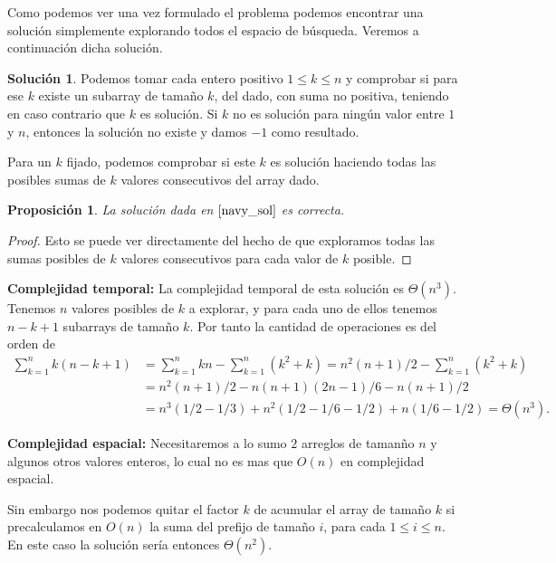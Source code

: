 \documentclass[10pt]{amsart}
\newtheorem{prop}[theorem]{Proposici\'on}
\theoremstyle{definition}
\newtheorem{sol}[theorem]{Soluci\'on}
\numberwithin{equation}{section}
\begin{document}
	Como podemos ver una vez formulado el problema podemos encontrar una soluci\'on simplemente explorando todos el espacio de b\'usqueda. Veremos a continuaci\'on dicha soluci\'on.
	
	\begin{sol}\label{navy_sol}
		Podemos tomar cada entero positivo $1 \le k \le n$ y comprobar si para ese $k$ existe un subarray de tama\~no $k$, del dado, con suma no positiva, teniendo en caso contrario que $k$ es soluci\'on. Si $k$ no es soluci\'on para ning\'un valor entre $1$ y $n$, entonces la soluci\'on no existe y damos $-1$ como resultado.
		
		Para un $k$ fijado, podemos comprobar si este $k$ es soluci\'on haciendo todas las posibles sumas de $k$ valores consecutivos del array dado.
	\end{sol}

	\begin{prop}
		La soluci\'on dada en $\ref{navy_sol}$ es correcta.
	\end{prop}

	\begin{proof}
		Esto se puede ver directamente del hecho de que exploramos todas las sumas posibles de $k$ valores consecutivos para cada valor de $k$ posible.		
	\end{proof}

	\textbf{Complejidad temporal:} La complejidad temporal de esta soluci\'on es $\Theta(n^3)$. Tenemos $n$ valores posibles de $k$ a explorar, y para cada uno de ellos tenemos $n - k + 1$ subarrays de tama\~no $k$. Por tanto la cantidad de operaciones es del orden de 
	\begin{align}
		\sum_{k = 1}^n k(n - k + 1) &= \sum_{k = 1}^n kn - \sum_{k = 1}^n  (k^2 + k) = n^2(n + 1) / 2 - \sum_{k = 1}^n ( k^2 + k) 
		\\ &= n^2(n+1)/2 - n(n+1)(2n-1)/6 - n( n+ 1) / 2 
		\\ &= n^3(1/2 - 1/3) + n^2(1/2 - 1/6 - 1/2) + n(1/6 - 1/2) = \Theta(n^3).  
	\end{align}

	\textbf{Complejidad espacial:} Necesitaremos a lo sumo $2$ arreglos de taman\~no $n$ y algunos otros valores enteros, lo cual no es mas que $O(n)$ en complejidad espacial. 

	Sin embargo nos podemos quitar el factor $k$ de acumular el array de tama\~no $k$ si precalculamos en $O(n)$ la suma del prefijo de tama\~no $i$, para cada $1\le i \le n$. En este caso la soluci\'on ser\'ia entonces $\Theta(n^2)$.
	
\end{document}
